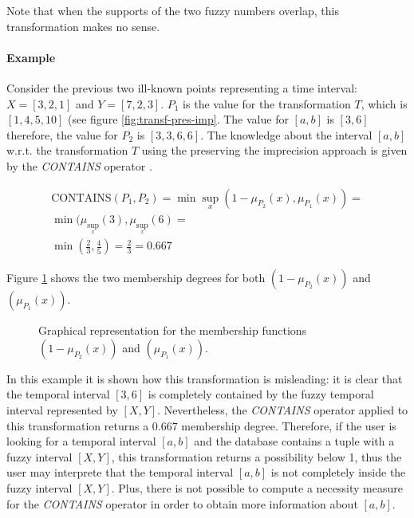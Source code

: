 \documentclass[twoside,twocolumn,a4paper]{article}
\begin{document}

Note that when the supports of the two fuzzy numbers overlap, this transformation makes no sense.


\paragraph{Example}
Consider the previous two ill-known points representing a time interval:  $X = \left[3, 2, 1\right]$ and $Y = \left[7, 2, 3 \right]$.
$P_1$ is the value for the transformation $T$, which is $\left[1,4,5,10 \right]$ (see figure \ref{fig:transf-pres-imp}. 
The value for $\left[a, b \right]$ is $\left[3,6 \right]$ therefore, the value for $P_2$ is $\left[3,3,6,6 \right]$. 
The knowledge about the interval $\left[a, b \right]$ w.r.t. the transformation $T$ using the preserving the imprecision approach is given by the \emph{CONTAINS} operator \cite{Garrido2009}.

\begin{eqnarray}
\nonumber
\mbox{CONTAINS}\left(P_1,P_2 \right) = \min \sup_{x} \left(1-\mu_{P_2}(x),\mu_{P_1}(x) \right) = \\
\nonumber
 \min (\mu_{\sup_x}(3),\mu_{\sup_x}(6) = \\
\nonumber
\min (\frac{2}{3},\frac{4}{5}) = \frac{2}{3} = 0.667
\end{eqnarray}

Figure \ref{fig:example_pi} shows the two membership degrees for both $\left(1-\mu_{P_2}(x)\right)$ and $\left( \mu_{P_1}(x) \right)$.

\begin{figure}[h!]
  \centering
  
  \caption{Graphical representation for the membership functions $\left(1-\mu_{P_2}(x)\right)$ and $\left( \mu_{P_1}(x) \right) $.}
  \label{fig:example_pi}
\end{figure}

In this example it is shown how this transformation is misleading: it is clear that the temporal interval $[3,6]$ is completely contained by the fuzzy temporal interval represented by $[X,Y]$. Nevertheless, the \emph{CONTAINS} operator applied to this transformation returns a 0.667 membership degree. Therefore, if the user is looking for a temporal interval $[a,b]$ and the database contains a tuple with a fuzzy interval $[X,Y]$, this transformation returns a possibility below 1, thus the user may interprete that the temporal interval $[a,b]$ is not completely inside the fuzzy interval $[X,Y]$. Plus, there is not possible to compute a necessity measure for the \emph{CONTAINS} operator in order to obtain more information about $[a,b]$.
\end{document}
